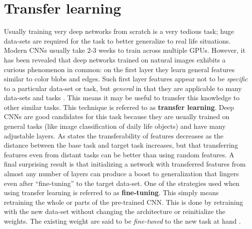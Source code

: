 \section{Transfer learning}
Usually training very deep networks from scratch is a very tedious task; huge data-sets are required for the task to better generalize to real life situations. Modern CNNs usually take 2-3 weeks to train across multiple GPUs. However, it has been revealed that deep networks trained on natural images exhibits a curious phenomenon in common: on the first layer they learn general features similar to color blobs and edges. Such first layer features appear not to be \emph{specific} to a particular data-set or task, but \emph{general} in that they are applicable to many data-sets and tasks \cite{Transfer}. This means it may be useful to transfer this knowledge to other similar tasks. This technique is referred to as \textbf{transfer learning}. Deep CNNs are good candidates for this task because they are usually trained on general tasks (like image classification of daily life objects) and have many adjustable layers. As \cite{Transfer} states the transferability of features decreases as the distance between the base task and target task increases, but that transferring features even from distant tasks can be better than using random features. A final surprising result is that initializing a network with transferred features from almost any number of layers can produce a boost to generalization that lingers even after ``fine-tuning'' to the target data-set. One of the strategies used when using transfer learning is referred to as \textbf{fine-tuning}.
This simply means retraining the whole or parts of the pre-trained CNN. This is done by retraining with the new data-set without changing the architecture or reinitialize the weights. The existing weight are said to be \emph{fine-tuned} to the new task at hand \cite{ntnu}.
